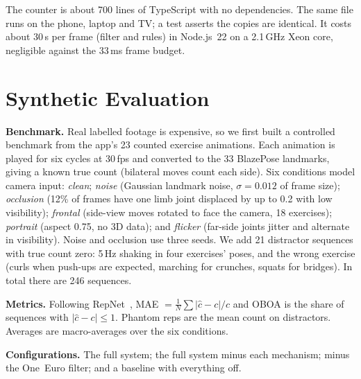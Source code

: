 \documentclass[conference]{IEEEtran}
\begin{document}
The counter is about 700 lines of TypeScript with no dependencies. The same file runs on
the phone, laptop and TV; a test asserts the copies are identical. It costs about
30\,\textmu s per frame (filter and rules) in Node.js~22 on a 2.1\,GHz Xeon core,
negligible against the 33\,ms frame budget.

\section{Synthetic Evaluation}\label{sec:eval}

\textbf{Benchmark.} Real labelled footage is expensive, so we first built a controlled
benchmark from the app's 23 counted exercise animations. Each animation is played for
six cycles at 30\,fps and converted to the 33 BlazePose landmarks, giving a known true
count (bilateral moves count each side). Six conditions model camera input:
\emph{clean}; \emph{noise} (Gaussian landmark noise, $\sigma=0.012$ of frame size);
\emph{occlusion} (12\% of frames have one limb joint displaced by up to 0.2 with low
visibility); \emph{frontal} (side-view moves rotated to face the camera, 18 exercises);
\emph{portrait} (aspect 0.75, no 3D data); and \emph{flicker} (far-side joints jitter and
alternate in visibility). Noise and occlusion use three seeds. We add 21 distractor
sequences with true count zero: 5\,Hz shaking in four exercises' poses, and the wrong
exercise (curls when push-ups are expected, marching for crunches, squats for bridges).
In total there are 246 sequences.

\textbf{Metrics.} Following RepNet~\cite{dwibedi2020repnet}, MAE $=\frac{1}{N}\sum
|\hat{c}-c|/c$ and OBOA is the share of sequences with $|\hat{c}-c|\le1$. Phantom reps
are the mean count on distractors. Averages are macro-averages over the six conditions.

\textbf{Configurations.} The full system; the full system minus each mechanism; minus the
One~Euro filter; and a baseline with everything off.

\begin{table}[t]
\caption{Ablation on the synthetic benchmark (macro-average over six conditions)}
\label{tab:ablation}
\centering
\small

\end{table}
\end{document}
